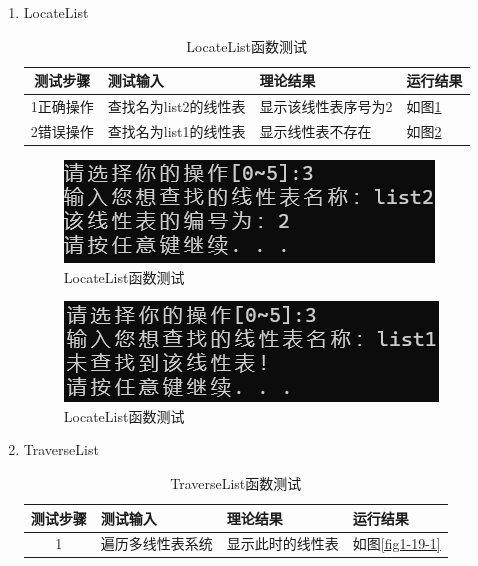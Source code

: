 \documentclass[supercite]{Experimental_Report}
\theoremstyle{definition}
\begin{document}
\begin{enumerate}
	\item LocateList
	\begin{table}[h!]
		\begin{center}
			\caption{LocateList函数测试}
			\begin{tabular}{|c|p{4cm}<{\centering}|p{4cm}<{\centering}|p{4cm}<{\centering}|} 
				\hline
				\textbf{测试步骤} & \textbf{测试输入} & \textbf{理论结果} & \textbf{运行结果} \\
				\hline
				1正确操作 & 查找名为list2的线性表 &显示该线性表序号为2 &如图\ref{fig1-18-1}\\
				\hline
				2错误操作 & 查找名为list1的线性表 &显示线性表不存在 &如图\ref{fig1-18-2}\\
				\hline
			\end{tabular}
		\end{center}
	\end{table}
	\begin{figure}[H] %
		\begin{center}
			\includegraphics[width=0.5\linewidth]{images/linklist/19-3-1.png}
			\caption{ LocateList函数测试}
			\label{fig1-18-1}
		\end{center}
	\end{figure}
\begin{figure}[H] %
	\begin{center}
		\includegraphics[width=0.5\linewidth]{images/linklist/19-3-2.png}
		\caption{ LocateList函数测试}
		\label{fig1-18-2}
	\end{center}
\end{figure}
	\item TraverseList
	\begin{table}[h!]
		\begin{center}
			\caption{TraverseList函数测试}
			\begin{tabular}{|c|p{4cm}<{\centering}|p{4cm}<{\centering}|p{4cm}<{\centering}|} 
				\hline
				\textbf{测试步骤} & \textbf{测试输入} & \textbf{理论结果} & \textbf{运行结果} \\
				\hline
				1 & 遍历多线性表系统 &显示此时的线性表 &如图\ref{fig1-19-1}\\

\end{tabular}
\end{center}
\end{table}
\end{enumerate}
\end{document}
